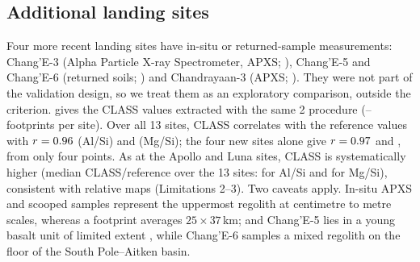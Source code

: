 \subsection{Additional landing sites}\label{sec:newsites}
Four more recent landing sites have in-situ or returned-sample measurements: Chang'E-3 (Alpha Particle X-ray Spectrometer, APXS; \citealp{Ng2023}), Chang'E-5 and Chang'E-6 (returned soils; \citealp{Li2022CE5,Li2024CE6}) and Chandrayaan-3 (APXS; \citealp{Vadawale2024}). They were not part of the validation design, so we treat them as an exploratory comparison, outside the criterion.  gives the CLASS values extracted with the same 2\textdegree{} procedure (\NewSiteFpMin--\NewSiteFpMax{} footprints per site). Over all 13 sites, CLASS correlates with the reference values with $r=0.96$ (Al/Si) and \AllSiteMgR{} (Mg/Si); the four new sites alone give $r=0.97$ and \NewSiteMgR, from only four points. As at the Apollo and Luna sites, CLASS is systematically higher (median CLASS/reference over the 13 sites: \AllSiteAlScale{} for Al/Si and \AllSiteMgScale{} for Mg/Si), consistent with relative maps (Limitations 2--3). Two caveats apply. In-situ APXS and scooped samples represent the uppermost regolith at centimetre to metre scales, whereas a footprint averages $25\times37$\,km; and Chang'E-5 lies in a young basalt unit of limited extent \citep{Che2021,Tian2021,Qian2023}, while Chang'E-6 samples a mixed regolith on the floor of the South Pole--Aitken basin.

\begin{table}[!tp]
\centering
\small
\caption{Additional landing sites (exploratory comparison): reference element weight ratios and CLASS weighted means within 2\textdegree{} ($\pm$ formal standard error). Reference values are converted from oxide weight fractions with oxide-to-element mass factors, using: Chang'E-3, \citet{Ng2023}, Table 9, LS1 mean; Chang'E-5, \citet{Li2022CE5}, Table 1, bulk XRF; Chang'E-6, \citet{Li2024CE6}, soil CE6C0000YJFM00102; Chandrayaan-3, \citet{Vadawale2024}, Table 1, APXS oxide means.}\label{tab:newsites}

\end{table}

